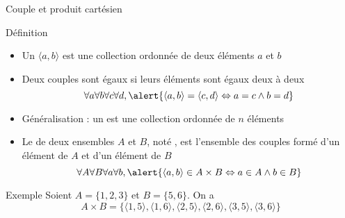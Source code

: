 
\begingroup

\begin{frame}{Couple et produit cartésien}
  \begin{block}{Définition}
    \begin{itemize}
    \item Un  $\langle a, b \rangle$ est une \alert{collection ordonnée de deux éléments} $a$ et $b$
    \item Deux couples sont égaux si leurs éléments sont égaux deux à deux 
      \vspace{-2mm}
      $$\forall a \forall b \forall c \forall d, \alert{\langle a, b \rangle =  \langle c, d \rangle \Leftrightarrow a = c \land b = d}$$
    \item Généralisation : un  est une \alert{collection ordonnée de $n$ éléments}
    \item Le  de deux ensembles $A$ et $B$, noté , est \alert{l'ensemble des couples formé d'un élément de $A$ et d'un élément de $B$}
      \vspace{-2mm}
      $$\forall A \forall B \forall a \forall b, \alert{\langle a, b \rangle \in A \times B \Leftrightarrow a \in A \land b \in B}$$
    \end{itemize}
  \end{block}
  \vspace{-2mm}
  \begin{exampleblock}{Exemple}
    Soient $A = \{1, 2, 3\}$ et $B = \{5, 6\}$. On a
    \vspace{-2mm}
    $$A\times B = \{\langle 1, 5 \rangle, \langle 1, 6 \rangle, \langle 2, 5 \rangle, \langle 2, 6 \rangle, \langle 3, 5 \rangle, \langle 3, 6 \rangle\}$$ 
  \end{exampleblock}
\end{frame}
\endgroup
